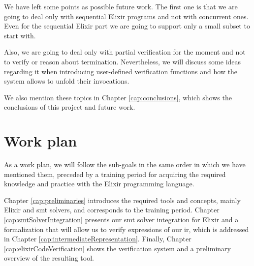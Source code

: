 We have left some points as possible future work. The first one is that we are
going to deal only with sequential Elixir programs and not with concurrent ones.
Even for the sequential Elixir part we are going to support only a small subset 
to start with.

Also, we are going to deal only with partial verification for the moment and not
to verify or reason about termination. Nevertheless, we will discuss some ideas 
regarding it when introducing user-defined verification functions and how the 
system allows to unfold their invocations.  

We also mention these topics in Chapter \ref{cap:conclusions}, which shows the 
conclusions of this project and future work.

\section{Work plan}

As a work plan, we will follow the sub-goals in the same order in which we have
mentioned them, preceded by a training period for acquiring the required
knowledge and practice with the Elixir programming language.

Chapter \ref{cap:preliminaries} introduces the required tools and concepts, 
mainly Elixir and \acrshort{smt} solvers, and corresponds to the training
period. Chapter \ref{cap:smtSolverIntegration} presents our \acrshort{smt}
solver integration for Elixir and a formalization that will allow us to verify
expressions of our \gls{ir}, which is addressed in Chapter
\ref{cap:intermediateRepresentation}. Finally, Chapter 
\ref{cap:elixirCodeVerification} shows the verification system and a preliminary
overview of the resulting tool.
